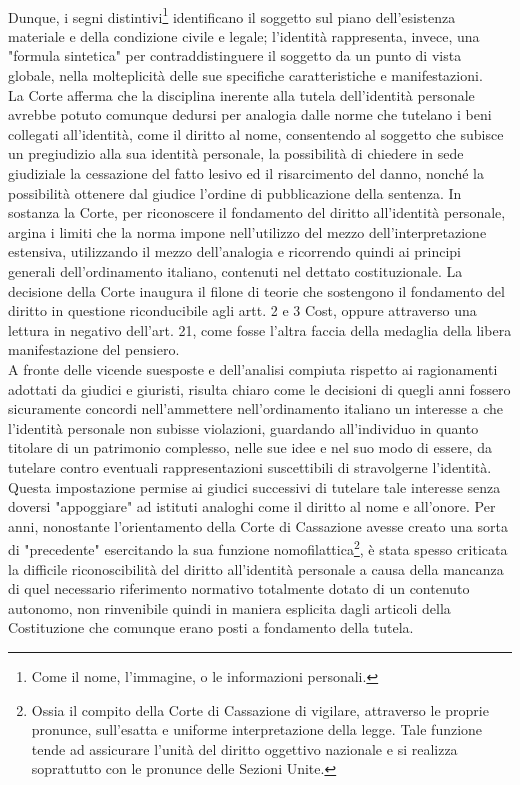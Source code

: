 \\Dunque, i segni distintivi\footnote{Come il nome, l'immagine, o le informazioni personali.} identificano il soggetto sul piano dell'esistenza materiale e della condizione civile e legale; l'identità rappresenta, invece, una "formula sintetica" per contraddistinguere il soggetto da un punto di vista globale, nella molteplicità delle sue specifiche caratteristiche e manifestazioni.
\\La Corte afferma che la disciplina inerente alla tutela dell'identità personale avrebbe potuto comunque dedursi per analogia dalle norme che tutelano i beni collegati all’identità, come il diritto al nome, consentendo al soggetto che subisce un pregiudizio alla sua identità personale, la possibilità di chiedere in sede giudiziale la cessazione del fatto lesivo ed il risarcimento del danno, nonché la possibilità ottenere dal giudice l’ordine di pubblicazione della sentenza.
In sostanza la Corte, per riconoscere il fondamento del diritto all'identità personale, argina i limiti che la norma impone nell'utilizzo del mezzo dell'interpretazione estensiva, utilizzando il mezzo dell'analogia e ricorrendo quindi ai principi generali dell'ordinamento italiano, contenuti nel dettato costituzionale.
La decisione della Corte inaugura il filone di teorie che sostengono il fondamento del diritto in questione riconducibile agli artt. 2 e 3 Cost, oppure attraverso una lettura in negativo dell'art. 21, come fosse l'altra faccia della medaglia della libera manifestazione del pensiero.
\\A fronte delle vicende suesposte e dell'analisi compiuta rispetto ai ragionamenti adottati da giudici e giuristi, risulta chiaro come le decisioni di quegli anni fossero sicuramente concordi nell’ammettere nell’ordinamento italiano un interesse a che l’identità personale non subisse violazioni, guardando all’individuo in quanto titolare di un patrimonio complesso, nelle sue idee e nel suo modo di essere, da tutelare contro eventuali rappresentazioni suscettibili di stravolgerne l'identità. 
Questa impostazione permise ai giudici successivi di tutelare tale interesse senza doversi "appoggiare" ad istituti analoghi come il diritto al nome e all'onore.
Per anni, nonostante l'orientamento della Corte di Cassazione avesse creato una sorta di "precedente" esercitando la sua funzione nomofilattica\footnote{Ossia il compito della Corte di Cassazione di vigilare, attraverso le proprie pronunce, sull'esatta e uniforme interpretazione della legge.
Tale funzione tende ad assicurare l'unità del diritto oggettivo nazionale e si realizza soprattutto con le pronunce delle Sezioni Unite.}, è stata spesso criticata la difficile riconoscibilità del diritto all'identità personale a causa della mancanza di quel necessario riferimento normativo totalmente dotato di un contenuto autonomo, non rinvenibile quindi in maniera esplicita dagli articoli della Costituzione che comunque erano posti a fondamento della tutela.
